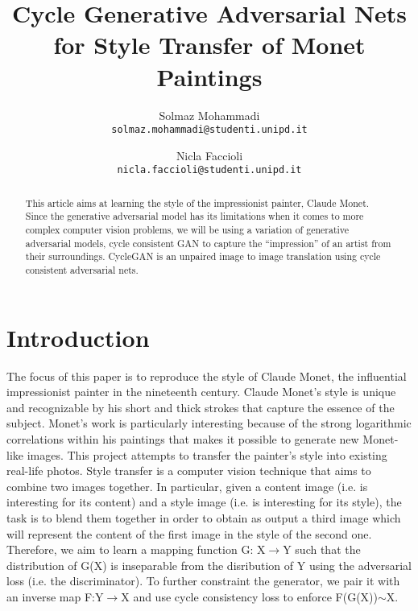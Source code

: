 \documentclass[10pt,twocolumn,letterpaper]{article}
\begin{document}
\title{Cycle Generative Adversarial Nets for Style Transfer of Monet Paintings}

\author{Solmaz Mohammadi\\
{\tt\small solmaz.mohammadi@studenti.unipd.it}
\and
Nicla Faccioli\\
{\tt\small nicla.faccioli@studenti.unipd.it}
}

\maketitle

\begin{abstract}
   This article aims at learning the style of the impressionist
painter, Claude Monet. Since the generative adversarial
model has its limitations when it comes to more complex
computer vision problems, we will be using a variation
of generative adversarial models, cycle consistent GAN to capture the
“impression” of an artist from their surroundings. CycleGAN is an unpaired image to image translation using cycle consistent adversarial nets.
\end{abstract}

\section{Introduction}
The focus of this paper is to reproduce the style of Claude Monet, the
influential impressionist painter in the nineteenth century. Claude Monet’s style is unique and recognizable by his short and thick strokes that capture the essence of the subject. Monet’s work is particularly interesting because of the strong logarithmic correlations within his paintings that makes it possible to generate new Monet-like images. \cite{monetlog}
This project attempts to transfer the painter's style into existing real-life photos. Style transfer is a computer vision technique that aims to combine two images together. In particular, given a content image (i.e. is interesting for its content) and a style image (i.e. is interesting for its style), the task is to blend them together in order to obtain as output a third image which will represent the content of the first image in the style of the second one. Therefore, we aim to learn a mapping function G: X$\longrightarrow$Y such that the distribution of G(X) is inseparable from the disribution of Y using the adversarial loss (i.e. the discriminator). To further constraint the generator, we pair it with an inverse map F:Y$\longrightarrow$X and use cycle consistency loss to enforce F(G(X))$\sim$X. \cite{cyclegan}
\end{document}
